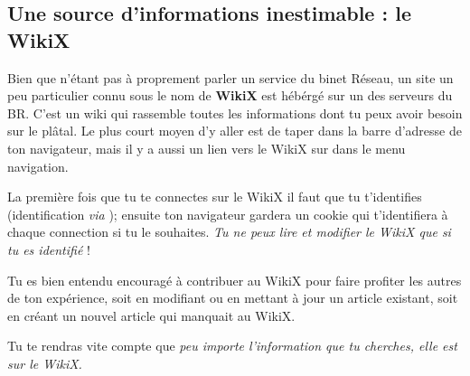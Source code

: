 
\subsection{Une source d'informations inestimable : le WikiX}
\label{WikiX}
Bien que n'\'etant pas \`a proprement parler un service du binet R\'eseau, un site un peu particulier connu sous le nom de \textbf{WikiX} est h\'eb\'erg\'e sur un des serveurs du BR.
C'est un wiki qui rassemble toutes les informations dont tu peux avoir besoin sur le pl\^atal.
Le plus court moyen d'y aller est de taper  dans la barre d'adresse de ton navigateur, mais il y a aussi un lien vers le WikiX sur \fkz dans le menu navigation.

La premi\`ere fois que tu te connectes sur le WikiX il faut que tu t'identifies (identification \emph{via} );
ensuite ton navigateur gardera un cookie qui t'identifiera \`a chaque connection si tu le souhaites. \emph{Tu ne peux lire et modifier le WikiX que si tu es identifi\'e} !

Tu es bien entendu encourag\'e \`a contribuer au WikiX pour faire profiter les autres de ton exp\'erience, 
soit en modifiant ou en mettant \`a jour un article existant, soit en cr\'eant un nouvel article qui manquait au WikiX.


Tu te rendras vite compte que \emph{peu importe l'information que tu cherches, elle est sur le WikiX.}
